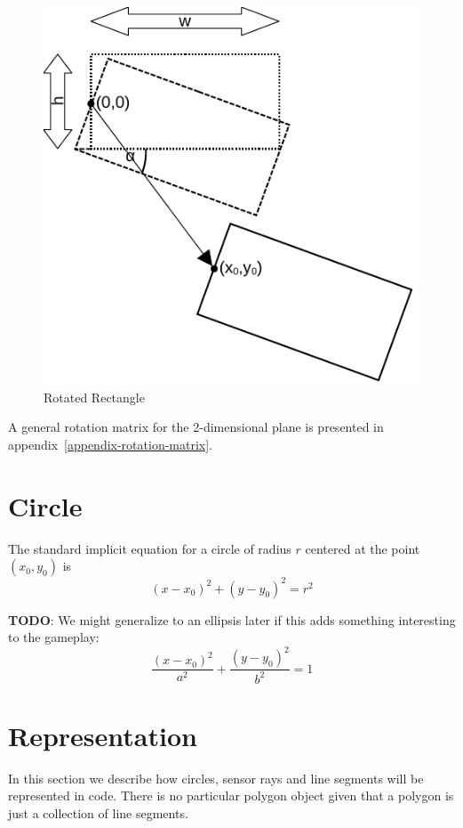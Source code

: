 \documentclass[11pt]{article}
\newcommand{\TODO}{{\bf TODO}}
\begin{document}
\begin{figure}
    \centering
    \includegraphics[trim=0 0 0 0]{rectangle.pdf}
    \caption{Rotated Rectangle}\label{fig-rectangle}
\end{figure}

A general rotation matrix for the 2-dimensional plane is presented in
appendix~\ref{appendix-rotation-matrix}.


\section{Circle}
\label{sec-circle}

The standard implicit equation for a circle of radius $r$  centered at the
point $(x_0, y_0)$ is
\begin{equation}
    (x - x_0)^2 + (y - y_0)^2 = r^2\label{eq-circle}
\end{equation}

\TODO: We might generalize to an ellipsis later if this adds something
interesting to the gameplay:
\begin{equation}
    \frac{(x-x_0)^2}{a^2} + \frac{(y-y_0)^2}{b^2} = 1
\end{equation}

\section{Representation}
\label{sec-representation}
In this section we describe how circles, sensor rays and line segments will be
represented in code. There is no particular polygon object given that a
polygon is just a collection of line segments.
\end{document}
